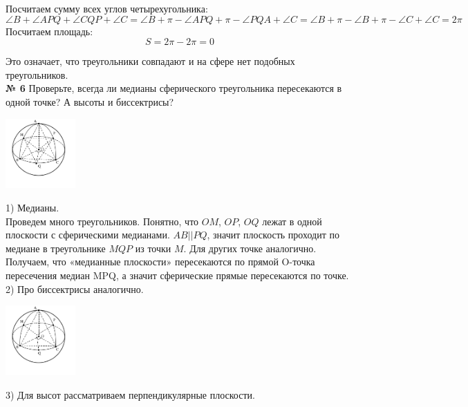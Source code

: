     Посчитаем сумму всех углов четырехугольника:
    \[
        \angle B + \angle APQ + \angle CQP + \angle C =
        \angle B + \pi - \angle APQ + \pi - \angle PQA + \angle C =
        \angle B + \pi - \angle B + \pi - \angle C + \angle C = 2\pi
    \]
    Посчитаем площадь:
    \[
        S = 2\pi - 2\pi = 0
    \]

    Это означает, что треугольники совпадают и на сфере нет подобных треугольников.\\


    \textbf{№ 6}
    Проверьте, всегда ли медианы сферического треугольника пересекаются в одной точке?
    А высоты и биссектрисы?

    \begin{center}
        \includegraphics[width=0.2\textwidth]{images/Frame 73}\\
    \end{center}

    1) Медианы.\\

    Проведем много треугольников.
    Понятно, что $OM$, $OP$, $OQ$ лежат в одной плоскости с сферическими медианами.
    $AB || PQ$, значит плоскость проходит по медиане в треугольнике $MQP$ из точки $M$.
    Для других точке аналогично.
    Получаем, что «медианные плоскости» пересекаются по прямой O-точка пересечения медиан MPQ,
    а значит сферические прямые пересекаются по точке.\\

    2) Про биссектрисы аналогично.

    \begin{center}
        \includegraphics[width=0.2\textwidth]{images/Frame 74}\\
    \end{center}

    3) Для высот рассматриваем перпендикулярные плоскости.\\


